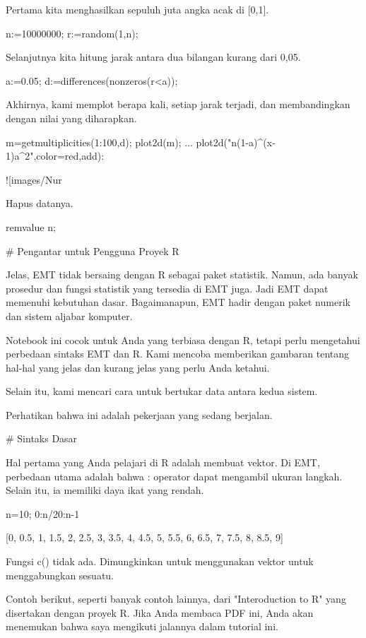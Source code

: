\documentclass{article}
\begin{document}
Pertama kita menghasilkan sepuluh juta angka acak di [0,1].


\>n:=10000000; r:=random(1,n);


Selanjutnya kita hitung jarak antara dua bilangan kurang dari 0,05.


\>a:=0.05; d:=differences(nonzeros(r<a));


Akhirnya, kami memplot berapa kali, setiap jarak terjadi, dan
membandingkan dengan nilai yang diharapkan.


\>m=getmultiplicities(1:100,d); plot2d(m); ...  
\>     plot2d("n\*(1-a)^(x-1)\*a^2",color=red,\>add):


![images/Nur%

Hapus datanya.


\>remvalue n;


# Pengantar untuk Pengguna Proyek R

Jelas, EMT tidak bersaing dengan R sebagai paket statistik. Namun, ada
banyak prosedur dan fungsi statistik yang tersedia di EMT juga. Jadi
EMT dapat memenuhi kebutuhan dasar. Bagaimanapun, EMT hadir dengan
paket numerik dan sistem aljabar komputer.


Notebook ini cocok untuk Anda yang terbiasa dengan R, tetapi perlu
mengetahui perbedaan sintaks EMT dan R. Kami mencoba memberikan
gambaran tentang hal-hal yang jelas dan kurang jelas yang perlu Anda
ketahui.


Selain itu, kami mencari cara untuk bertukar data antara kedua sistem.


Perhatikan bahwa ini adalah pekerjaan yang sedang berjalan.


# Sintaks Dasar

Hal pertama yang Anda pelajari di R adalah membuat vektor. Di EMT,
perbedaan utama adalah bahwa : operator dapat mengambil ukuran
langkah. Selain itu, ia memiliki daya ikat yang rendah.


\>n=10; 0:n/20:n-1


    [0,  0.5,  1,  1.5,  2,  2.5,  3,  3.5,  4,  4.5,  5,  5.5,  6,  6.5,
    7,  7.5,  8,  8.5,  9]

Fungsi c() tidak ada. Dimungkinkan untuk menggunakan vektor untuk
menggabungkan sesuatu.


Contoh berikut, seperti banyak contoh lainnya, dari "Interoduction to
R" yang disertakan dengan proyek R. Jika Anda membaca PDF ini, Anda
akan menemukan bahwa saya mengikuti jalannya dalam tutorial ini.
\end{document}

